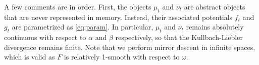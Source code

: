 A few comments are in order. First, the objects $\mu_t$ and $\nu_t$ are abstract
objects that are never represented in memory. Instead, their associated
potentials $f_t$ and $g_t$ are parametrized as \eqref{eq:param}. In particular,
$\mu_t$ and $\nu_t$ remains absolutely continuous with respect to $\alpha$ and
$\beta$ respectively, so that the Kullbach-Liebler divergence remains finite. Note that we
perform mirror descent in infinite spaces, which is valid as $F$ is
relatively 1-smooth with respect to $\omega$.
















